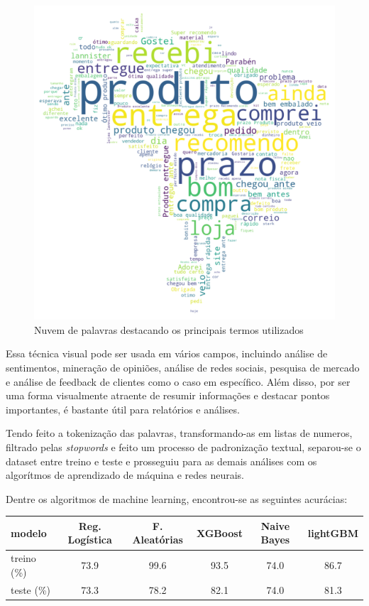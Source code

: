 \begin{figure}[H]
    \centering
    \includegraphics[scale=0.8]{./figs/word_cloud.png}
    \caption{Nuvem de palavras destacando os principais termos utilizados}
    \label{fig:wordCloud}
\end{figure}

Essa técnica visual pode ser usada em vários campos, incluindo análise de sentimentos, mineração de opiniões, análise de redes sociais, pesquisa de mercado e análise de feedback de clientes como o caso em específico. Além disso, por ser uma forma visualmente atraente de resumir informações e destacar pontos importantes, é bastante útil para relatórios e análises.

Tendo feito a tokenização das palavras, transformando-as em listas de numeros, filtrado pelas \textit{stopwords} e feito um processo de padronização textual, separou-se o dataset entre treino e teste e prosseguiu para as demais análises com os algorítmos de aprendizado de máquina e redes neurais.

Dentre os algoritmos de machine learning, encontrou-se as seguintes acurácias:

\begin{table}[H]
    \centering
    \begin{tabular}{l|ccccc}
        \hline
        { modelo}      & { Reg. Logística} & { F. Aleatórias} & { XGBoost} & { Naive Bayes} & lightGBM \\ \hline\hline
        { treino (\%)} & { 73.9}           & { 99.6}          & { 93.5}    & { 74.0}        & 86.7     \\\hline
        { teste (\%)}  & { 73.3}           & { 78.2}          & { 82.1}    & { 74.0}        & 81.3
    \end{tabular}
\end{table}

